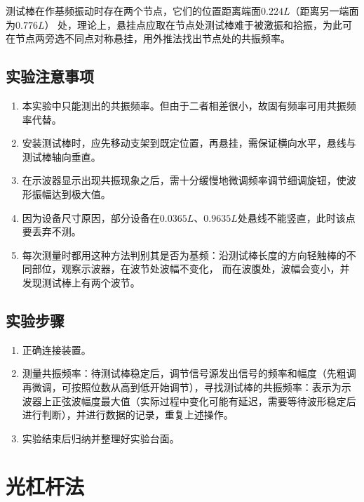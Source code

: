 \documentclass[UTF8]{article}
\theoremstyle{MyLineTheoremStyle} %
\theoremstyle{MyBlockTheoremStyle} %
\theoremstyle{MySubsubsectionStyle} %
\begin{document}
测试棒在作基频振动时存在两个节点，它们的位置距离端面$0.224L $（距离另一端面为$0.776L$）
处，理论上，悬挂点应取在节点处测试棒难于被激振和拾振，为此可在节点两旁选不同点对称悬挂，用外推法找出节点处的共振频率。


\subsection{实验注意事项}

\begin{enumerate}
\item 本实验中只能测出的共振频率。但由于二者相差很小，故固有频率可用共振频率代替。

\item 安装测试棒时，应先移动支架到既定位置，再悬挂，需保证横向水平，悬线与测试棒轴向垂直。

\item 在示波器显示出现共振现象之后，需十分缓慢地微调频率调节细调旋钮，使波形振幅达到极大值。

\item 因为设备尺寸原因，部分设备在$0.0365L$、$ 0.9635L$处悬线不能竖直，此时该点要丢弃不测。

\item 每次测量时都用这种方法判别其是否为基频：沿测试棒长度的方向轻触棒的不同部位，观察示波器，在波节处波幅不变化，
而在波腹处，波幅会变小，并发现测试棒上有两个波节。

\end{enumerate}

\subsection{实验步骤}
\begin{enumerate}
\item 正确连接装置。

\item 测量共振频率：待测试棒稳定后，调节信号源发出信号的频率和幅度（先粗调再微调，可按照位数从高到低开始调节），寻找测试棒的共振频率：表示为示波器上正弦波幅度最大值（实际过程中变化可能有延迟，需要等待波形稳定后进行判断），并进行数据的记录，重复上述操作。

\item 实验结束后归纳并整理好实验台面。

\end{enumerate}

\section{光杠杆法}
\end{document}

